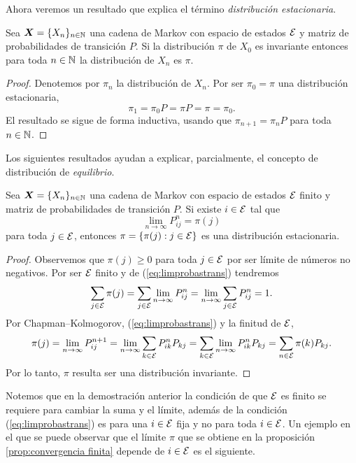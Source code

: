 Ahora veremos un resultado que explica el término \emph{distribución estacionaria}.

\begin{proposition} \label{prop:estacionario}
    Sea $\bm X = \{X_n\}_{n \in \mathbb{N}}$ una cadena de Markov con espacio de estados $\mathcal{E}$ y matriz de probabilidades de transición $P$. Si la distribución $\pi$ de $X_0$ es invariante entonces para toda $n \in \mathbb{N}$ la distribución de $X_n$ es $\pi$.
\end{proposition}

\begin{proof}
    Denotemos por $\pi_n$ la distribución de $X_n$. Por ser $\pi_0 = \pi$ una distribución estacionaria, 
    \[
        \pi_1 = \pi_0 P = \pi P = \pi = \pi_0.
    \] El resultado se sigue de forma inductiva, usando que $\pi_{n+1} = \pi_n P$ para toda $n \in \mathbb{N}$.
\end{proof}

Los siguientes resultados ayudan a explicar, parcialmente, el concepto de distribución de \emph{equilibrio}.

\begin{proposition} \label{prop:convergencia finita}
    Sea $\bm X = \{X_n\}_{n \in \mathbb{N}}$ una cadena de Markov con espacio de estados $\mathcal{E}$ finito y matriz de probabilidades de transición $P$. Si existe $i \in \mathcal{E}$ tal que 
    \begin{equation}
        \lim_{n \to \infty} P_{ij}^n = \pi(j)  \label{eq:limprobastrans}
    \end{equation}
    para toda $j \in \mathcal{E}$, entonces $\pi = \{\pi(j) : j \in \mathcal{E}\}$ es una distribución estacionaria. 
\end{proposition}

\begin{proof}
    Observemos que $\pi(j) \geq 0$ para toda $j \in \mathcal{E}$ por ser límite de números no negativos. Por ser $\mathcal{E}$ finito y de (\ref{eq:limprobastrans}) tendremos
    \[
        \sum_{j \in \mathcal{E}} \pi(j)  = \sum_{j \in \mathcal{E}} \lim_{n \to \infty} P_{ij}^n = \lim_{n \to \infty} \sum_{j \in \mathcal{E}} P_{ij}^n = 1.
    \]
    Por Chapman--Kolmogorov, (\ref{eq:limprobastrans}) y la finitud de $\mathcal{E}$,
    \[
        \pi(j) = \lim_{n \to \infty} P_{ij}^{n+1} = \lim_{n \to \infty} \sum_{k \in \mathcal{E}} P_{ik}^n P_{kj} = \sum_{k \in \mathcal{E}} \lim_{n \to \infty} P_{ik}^n P_{kj} = \sum_{n \in \mathcal{E}} \pi(k) P_{kj}.
    \]
    Por lo tanto, $\pi$ resulta ser una distribución invariante.
\end{proof}

Notemos que en la demostración anterior la condición de que $\mathcal{E}$ es finito se requiere para cambiar la suma y el límite, además de la condición (\ref{eq:limprobastrans}) es para una $i \in \mathcal{E}$ fija y no para toda $i \in \mathcal{E}$. Un ejemplo en el que se puede observar que el límite $\pi$ que se obtiene en la proposición \ref{prop:convergencia finita} depende de $i \in \mathcal{E}$ es el siguiente.

